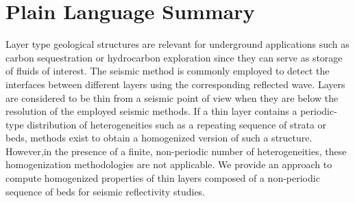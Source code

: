 \documentclass[draft]{agujournal2019}
\begin{document}
\section*{Plain Language Summary}
Layer type geological structures are relevant for underground applications such as carbon sequestration or hydrocarbon exploration since they can serve as storage of fluids of interest. The seismic method is commonly employed to detect the interfaces between different layers using the corresponding reflected wave. Layers are considered to be thin from a seismic point of view when they are below the resolution of the employed seismic methods. If a thin layer contains a periodic-type distribution of heterogeneities such as a repeating sequence of strata or beds, methods exist to obtain a homogenized version of such a structure.
However,in the presence of a finite, non-periodic number of heterogeneities, these homogenization methodologies are not applicable. We provide an approach to compute homogenized properties of thin layers composed of a non-periodic sequence of beds for seismic reflectivity studies.  


%
%
\end{document}
